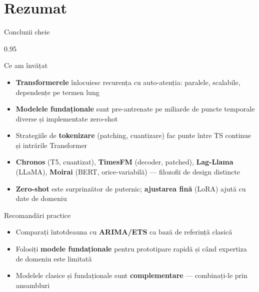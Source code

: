 \documentclass[9pt, aspectratio=169, t]{beamer}
\begin{document}
\section{Rezumat}

\begin{frame}{Concluzii cheie}
    \begin{cminipage}{0.95\textwidth}
    \vspace{-2mm}
    \begin{block}{Ce am învățat}
        {\small
        \begin{itemize}\setlength{\itemsep}{0pt}
            \item \textbf{Transformerele} înlocuiesc recurența cu auto-atenția: paralele, scalabile, dependențe pe termen lung
            \item \textbf{Modelele fundaționale} sunt pre-antrenate pe miliarde de puncte temporale diverse și implementate zero-shot
            \item Strategiile de \textbf{tokenizare} (patching, cuantizare) fac punte între TS continue și intrările Transformer
            \item \textbf{Chronos} (T5, cuantizat), \textbf{TimesFM} (decoder, patched), \textbf{Lag-Llama} (LLaMA), \textbf{Moirai} (BERT, orice-variabilă) --- filozofii de design distincte
            \item \textbf{Zero-shot} este surprinzător de puternic; \textbf{ajustarea fină} (LoRA) ajută cu date de domeniu
        \end{itemize}
        }
    \end{block}
    \vspace{-2mm}
    \begin{alertblock}{Recomandări practice}
        {\small
        \begin{itemize}\setlength{\itemsep}{0pt}
            \item Comparați întotdeauna cu \textbf{ARIMA/ETS} ca bază de referință clasică
            \item Folosiți \textbf{modele fundaționale} pentru prototipare rapidă și când expertiza de domeniu este limitată
            \item Modelele clasice și fundaționale sunt \textbf{complementare} --- combinați-le prin ansambluri
        \end{itemize}
        }
    \end{alertblock}
    \end{cminipage}
\end{frame}
\end{document}
